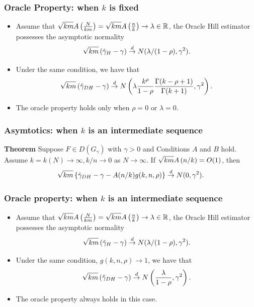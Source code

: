\documentclass{beamer}
\begin{document}
\begin{frame}
\frametitle{Oracle Property: when $k$ is fixed}
\begin{itemize}
    \item Assume that $\sqrt{km}A\left(\frac{N}{km}\right) =\sqrt{km}A\left(\frac{n}{k}\right)\to\lambda \in \mathbb{R}$, the Oracle Hill estimator possesses the asymptotic normality 
    $$
    \sqrt{km}\left(\hat{\gamma}_H-\gamma\right)\stackrel{d}{\to} N(\lambda/(1-\rho), \gamma^2).
    $$
    \pause
    \medskip
    \item Under the same condition, we have that
    $$
        \sqrt{km}\left(\hat{\gamma}_{DH}-\gamma\right)\stackrel{d}{\to} N\left(\lambda\frac{k^{\rho}}{1-\rho}\frac{\Gamma(k-\rho+1)}{\Gamma(k+1)},\gamma^2\right).
    $$
    \medskip
    \pause
    \item The oracle property holds only when $\rho= 0$ or $\lambda = 0$.
\end{itemize}
    


\end{frame}


\begin{frame}
    \frametitle{Asymtotics: when $k$ is an intermediate sequence}
{\bf Theorem } Suppose $F\in D(G_{\gamma})$ with $\gamma>0$ and Conditions $A$ and $B$ hold. Assume $k = k(N)\to\infty, k/n \to 0$ as $N\to\infty$. If $\sqrt{km}A\left(n/k\right) =O(1)$, then
$$
\sqrt{km}\left\{\hat{\gamma}_{DH}-\gamma-A(n/k) g(k,n,\rho)\right\}\stackrel{d}{\to} N(0,\gamma^2).
$$
    

\end{frame}

\begin{frame}
    \frametitle{Oracle property: when $k$ is an intermediate sequence }
    \begin{itemize}
        \item Assume that $\sqrt{km}A\left(\frac{N}{km}\right) =\sqrt{km}A\left(\frac{n}{k}\right)\to\lambda \in \mathbb{R}$, the Oracle Hill estimator possesses the asymptotic normality 
        $$
        \sqrt{km}\left(\hat{\gamma}_H-\gamma\right)\stackrel{d}{\to} N(\lambda/(1-\rho), \gamma^2).
        $$
        \pause
        \medskip
        \item Under the same condition, $g(k,n,\rho)\to 1$, we have that
        $$
            \sqrt{km}\left(\hat{\gamma}_{DH}-\gamma\right)\stackrel{d}{\to} N\left(\frac{\lambda}{1-\rho},\gamma^2\right).
        $$
        \medskip
        \pause
        \item The oracle property always holds in this case.
    \end{itemize}
\end{frame}
\end{document}
